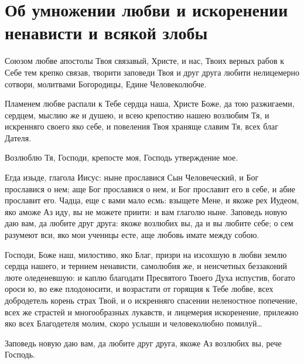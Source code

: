 \section{Об умножении любви и искоренении ненависти и всякой злобы}\begin{mymulticols}
 


Союзом любве апостолы Твоя связавый, Христе, и нас, Твоих верных рабов к Себе тем крепко связав, творити заповеди Твоя и друг друга любити нелицемерно сотвори, молитвами Богородицы, Едине Человеколюбче.


Пламенем любве распали к Тебе сердца наша, Христе Боже, да тою разжигаеми, сердцем, мыслию же и душею, и всею крепостию нашею возлюбим Тя, и искренняго своего яко себе, и повеления Твоя храняще славим Тя, всех благ Дателя.


Возлюблю Тя, Господи, крепосте моя, Господь утверждение мое.


Егда изыде, глагола Иисус: ныне прославися Сын Человеческий, и Бог прославися о нем; аще Бог прославися о нем, и Бог прославит его в себе, и абие прославит его. Чадца, еще с вами мало есмь: взыщете Мене, и якоже рех Иудеом, яко аможе Аз иду, вы не можете приити: и вам глаголю ныне. Заповедь новую даю вам, да любите друг друга: якоже возлюбих вы, да и вы любите себе; о сем разумеют вси, яко мои ученицы есте, аще любовь имате между собою.


Господи, Боже наш, милостиво, яко Благ, призри на изсохшую в любви землю сердца нашего, и тернием ненависти, самолюбия же, и неисчетных беззаконий люте оледеневшую: и каплю благодати Пресвятого Твоего Духа испустив, богато ороси ю, во еже плодоносити, и возрастати от горящия к Тебе любве, всех добродетель корень страх Твой, и о искренняго спасении неленостное попечение, всех же страстей и многообразных лукавств, и лицемерия искоренение, прилежно яко всех Благодетеля молим, скоро услыши и человеколюбно помилуй…


Заповедь новую даю вам, да любите друг друга, якоже Аз возлюбих вы, рече Господь.

\end{mymulticols}

